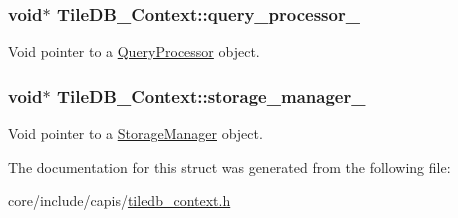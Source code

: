 \subsubsection[{query\+\_\+processor\+\_\+}]{\setlength{\rightskip}{0pt plus 5cm}void$\ast$ Tile\+D\+B\+\_\+\+Context\+::query\+\_\+processor\+\_\+}\label{structTileDB__Context_ae1f0cb3f7f12d72aee268bc23aeff5a3}
Void pointer to a \hyperlink{classQueryProcessor}{Query\+Processor} object. \hypertarget{structTileDB__Context_a22167896c250fe3eee8746b151c76c5e}{}
\subsubsection[{storage\+\_\+manager\+\_\+}]{\setlength{\rightskip}{0pt plus 5cm}void$\ast$ Tile\+D\+B\+\_\+\+Context\+::storage\+\_\+manager\+\_\+}\label{structTileDB__Context_a22167896c250fe3eee8746b151c76c5e}
Void pointer to a \hyperlink{classStorageManager}{Storage\+Manager} object. 

The documentation for this struct was generated from the following file\+:\begin{DoxyCompactItemize}
\item 
core/include/capis/\hyperlink{tiledb__context_8h}{tiledb\+\_\+context.\+h}\end{DoxyCompactItemize}

